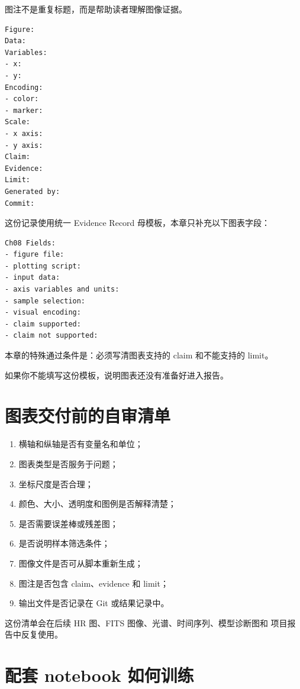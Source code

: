 图注不是重复标题，而是帮助读者理解图像证据。

\begin{examplebox}[图注模板]
\begin{lstlisting}[style=terminal]
Figure:
Data:
Variables:
- x:
- y:
Encoding:
- color:
- marker:
Scale:
- x axis:
- y axis:
Claim:
Evidence:
Limit:
Generated by:
Commit:
\end{lstlisting}
\end{examplebox}

这份记录使用统一 Evidence Record 母模板，本章只补充以下图表字段：

\begin{examplebox}
\begin{lstlisting}[style=terminal]
Ch08 Fields:
- figure file:
- plotting script:
- input data:
- axis variables and units:
- sample selection:
- visual encoding:
- claim supported:
- claim not supported:
\end{lstlisting}
\end{examplebox}

本章的特殊通过条件是：必须写清图表支持的 claim 和不能支持的 limit。

如果你不能填写这份模板，说明图表还没有准备好进入报告。

\section{图表交付前的自审清单}

\begin{enumerate}
    \item 横轴和纵轴是否有变量名和单位；
    \item 图表类型是否服务于问题；
    \item 坐标尺度是否合理；
    \item 颜色、大小、透明度和图例是否解释清楚；
    \item 是否需要误差棒或残差图；
    \item 是否说明样本筛选条件；
    \item 图像文件是否可从脚本重新生成；
    \item 图注是否包含 claim、evidence 和 limit；
    \item 输出文件是否记录在 Git 或结果记录中。
\end{enumerate}

这份清单会在后续 HR 图、FITS 图像、光谱、时间序列、模型诊断图和 项目报告中反复使用。

\section{配套 notebook 如何训练}

